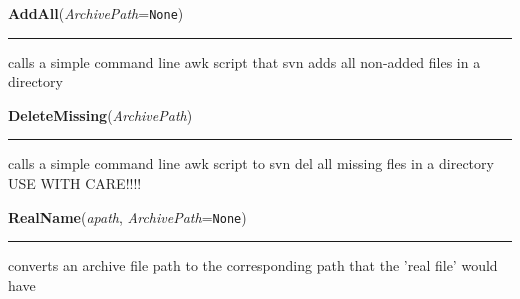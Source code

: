     \label{System:SVNOperations:AddAll}

    \vspace{0.5ex}

\hspace{.8\funcindent}\begin{boxedminipage}{\funcwidth}

    \raggedright \textbf{AddAll}(\textit{ArchivePath}={\tt None})

    \vspace{-1.5ex}

    \rule{\textwidth}{0.5\fboxrule}
\setlength{\parskip}{2ex}
    calls a simple command line awk script that svn adds all non-added 
    files in a directory

\setlength{\parskip}{1ex}
    \end{boxedminipage}

    \label{System:SVNOperations:DeleteMissing}

    \vspace{0.5ex}

\hspace{.8\funcindent}\begin{boxedminipage}{\funcwidth}

    \raggedright \textbf{DeleteMissing}(\textit{ArchivePath})

    \vspace{-1.5ex}

    \rule{\textwidth}{0.5\fboxrule}
\setlength{\parskip}{2ex}
    calls a simple command line awk script to svn del all missing fles in a
    directory USE WITH CARE!!!!

\setlength{\parskip}{1ex}
    \end{boxedminipage}

    \label{System:SVNOperations:RealName}

    \vspace{0.5ex}

\hspace{.8\funcindent}\begin{boxedminipage}{\funcwidth}

    \raggedright \textbf{RealName}(\textit{apath}, \textit{ArchivePath}={\tt None})

    \vspace{-1.5ex}

    \rule{\textwidth}{0.5\fboxrule}
\setlength{\parskip}{2ex}
    converts an archive file path to the corresponding path that the 'real 
    file' would have

\setlength{\parskip}{1ex}
    \end{boxedminipage}

